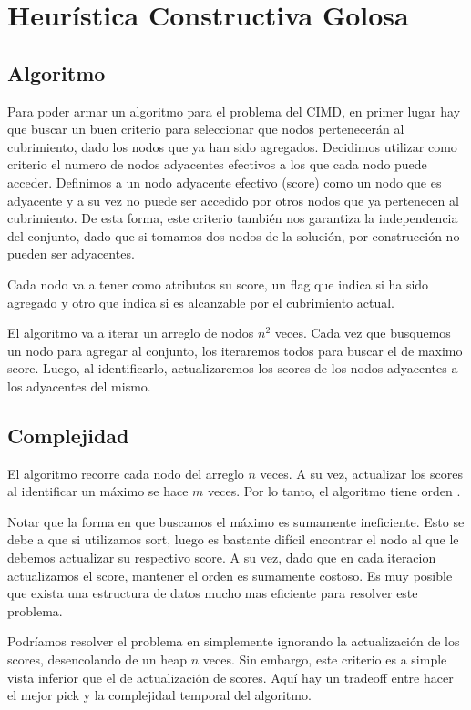 \section{Heurística Constructiva Golosa}

\subsection{Algoritmo}

Para poder armar un algoritmo para el problema del CIMD, en primer lugar hay que buscar un buen criterio para seleccionar que nodos pertenecerán al cubrimiento, dado los nodos que ya han sido agregados. Decidimos utilizar como criterio el numero de nodos adyacentes efectivos a los que cada nodo puede acceder. Definimos a un nodo adyacente efectivo (score) como un nodo que es adyacente y a su vez no puede ser accedido por otros nodos que ya pertenecen al cubrimiento. De esta forma, este criterio también nos garantiza la independencia del conjunto, dado que si tomamos dos nodos de la solución, por construcción no pueden ser adyacentes.

Cada nodo va a tener como atributos su score, un flag que indica si ha sido agregado y otro que indica si es alcanzable por el cubrimiento actual.

El algoritmo va a iterar un arreglo de nodos $n^2$ veces. Cada vez que busquemos un nodo para agregar al conjunto, los iteraremos todos para buscar el de maximo score. Luego, al identificarlo, actualizaremos los scores de los nodos adyacentes a los adyacentes del mismo.

\subsection{Complejidad}

El algoritmo recorre cada nodo del arreglo $n$ veces. A su vez, actualizar los scores al identificar un máximo se hace $m$ veces. Por lo tanto, el algoritmo tiene orden .

Notar que la forma en que buscamos el máximo es sumamente ineficiente. Esto se debe a que si utilizamos sort, luego es bastante difícil encontrar el nodo al que le debemos actualizar su respectivo score. A su vez, dado que en cada iteracion actualizamos el score, mantener el orden es sumamente costoso. Es muy posible que exista una estructura de datos mucho mas eficiente para resolver este problema.

Podríamos resolver el problema en  simplemente ignorando la actualización de los scores, desencolando de un heap $n$ veces. Sin embargo, este criterio es a simple vista inferior que el de actualización de scores. Aquí hay un tradeoff entre hacer el mejor pick y la complejidad temporal del algoritmo.

